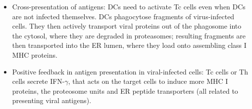 \documentclass{report}
\begin{document}
\begin{itemize}
\item Cross-presentation of antigens: DCs need to activate Tc cells even when DCs are not infected themselves. DCs phagocytose fragments of virus-infected cells. They then actively transport viral proteins out of the phagosome into the cytosol, where they are degraded in proteasomes; resulting fragments are then transported into the ER lumen, where they load onto assembling class I MHC proteins. 

\item Positive feedback in antigen presentation in viral-infected cells: Tc cells or Th cells secrete IFN-$\gamma$, that acts on the target cells to induce more MHC I proteins, the proteosome units and ER peptide transporters (all related to presenting viral antigens). 
\end{itemize}
\end{document}
